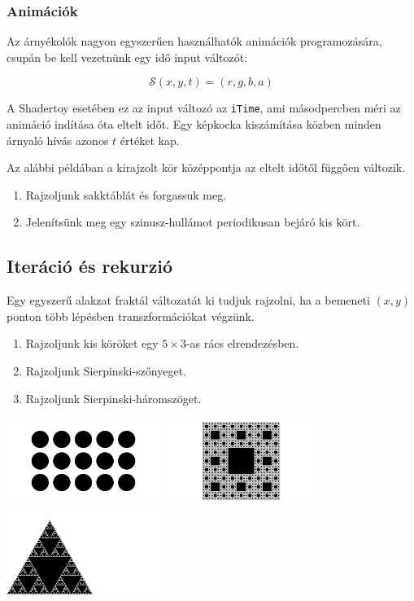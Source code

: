 \subsubsection{Animációk}
Az árnyékolók nagyon egyszerűen használhatók animációk programozására, csupán
be kell vezetnünk egy idő input változót:

$$\mathcal{S}(x, y, t) = (r, g, b, a)$$

A Shadertoy esetében ez az input változó az \texttt{iTime}, ami másodpercben méri az animáció indítása
óta eltelt időt. Egy képkocka kiszámítása közben minden árnyaló hívás azonos $t$ értéket kap.

Az alábbi példában a kirajzolt kör középpontja
az eltelt időtől függően változik.


\progfeladatok

\begin{enumerate}[resume]
  \item Rajzoljunk sakktáblát és forgassuk meg.
  \item Jelenítsünk meg egy szinusz-hullámot periodikusan bejáró kis kört.
\end{enumerate}

\subsection{Iteráció és rekurzió}

Egy egyszerű alakzat fraktál változatát ki tudjuk rajzolni, ha a bemeneti $(x,y)$
ponton több lépésben transzformációkat végzünk.

\progfeladatok
\begin{enumerate}[resume]
  \item Rajzoljunk kis köröket egy $5\times 3$-as rács elrendezésben.
  \item Rajzoljunk Sierpinski-szőnyeget.
  \item Rajzoljunk Sierpinski-háromszöget.
\end{enumerate}

\includegraphics[width=5cm]{images/iter01.png}
\includegraphics[width=5cm]{images/sier4.png}
\includegraphics[width=5cm]{images/sier3.png}



